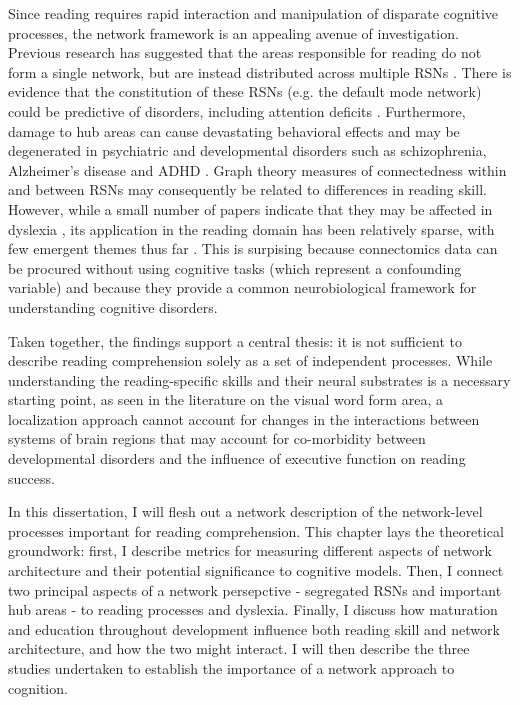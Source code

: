 Since reading requires rapid interaction and manipulation of disparate cognitive processes, the network framework is an appealing avenue of investigation. Previous research has suggested that the areas responsible for reading do not form a single network, but are instead distributed across multiple RSNs \citep{Vogel2013}. There is evidence that the constitution of these RSNs (e.g. the default mode network) could be predictive of disorders, including attention deficits \citep{Uddin2008}. Furthermore, damage to hub areas can cause devastating behavioral effects \citep{Warren2014} and may be degenerated in psychiatric and developmental disorders such as schizophrenia, Alzheimer's disease and ADHD \citep{Stam2014}. Graph theory measures of connectedness within and between RSNs may consequently be related to differences in reading skill. However, while a small number of papers indicate that they may be affected in dyslexia \citep{Qi2016, Finn2014}, its application in the reading domain has been relatively sparse, with few emergent themes thus far \citep{Cao2016}. This is surpising because connectomics data can be procured without using cognitive tasks (which represent a confounding variable) and because they provide a common neurobiological framework for understanding cognitive disorders.

Taken together, the findings support a central thesis: it is not sufficient to describe reading comprehension solely as a set of independent processes. While understanding the reading-specific skills and their neural substrates is a necessary starting point, as seen in the literature on the visual word form area, a localization approach cannot account for changes in the interactions between systems of brain regions that may account for co-morbidity between developmental disorders and the influence of executive function on reading success. 

In this dissertation, I will flesh out a network description of the network-level processes important for reading comprehension. This chapter lays the theoretical groundwork: first, I describe metrics for measuring different aspects of network architecture and their potential significance to cognitive models. Then, I connect two principal aspects of a network persepctive - segregated RSNs and important hub areas - to reading processes and dyslexia. Finally, I discuss how maturation and education throughout development influence both reading skill and network architecture, and how the two might interact. I will then describe the three studies undertaken to establish the importance of a network approach to cognition.


